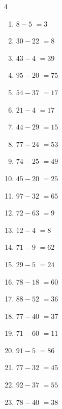 \begin{multicols}{4}
\begin{enumerate}
  \item $8-5$
        $=3$

  \item $30-22$
        $=8$

  \item $43-4$
        $=39$

  \item $95-20$
        $=75$

  \item $54-37$
        $=17$

  \item $21-4$
        $=17$

  \item $44-29$
        $=15$

  \item $77-24$
        $=53$

  \item $74-25$
        $=49$

\columnbreak %

  \item $45-20$
        $=25$

  \item $97-32$
        $=65$

  \item $72-63$
        $=9$

  \item $12-4$
        $=8$

  \item $71-9$
        $=62$

  \item $29-5$
        $=24$

  \item $78-18$
        $=60$

  \item $88-52$
        $=36$

  \item $77-40$
        $=37$

  \item $71-60$
        $=11$

  \item $91-5$
        $=86$

  \item $77-32$
        $=45$

  \item $92-37$
        $=55$

  \item $78-40$
        $=38$


\end{enumerate}
\end{multicols}
